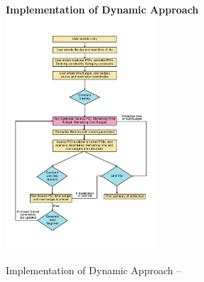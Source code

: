\begin{figure}[th]
\textbf{Implementation of Dynamic Approach}
\centering
\includegraphics[width=0.5\textwidth]{binary dynamic flowchart.png}
	\caption{Implementation of Dynamic Approach -- }
\label{fig:flowchart_dynamic}
\end{figure}


